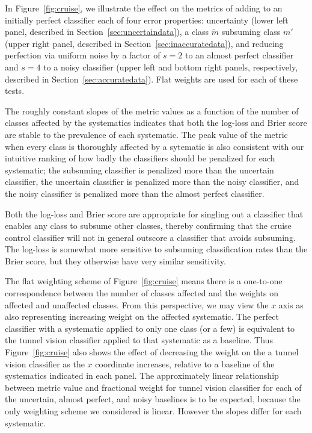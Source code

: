 In Figure~\ref{fig:cruise}, we illustrate the effect on the metrics of adding to an initially perfect classifier each of four error properties:
uncertainty (lower left panel, described in Section~\ref{sec:uncertaindata}),
a class $\tilde{m}$ subsuming class $m'$ (upper right panel, described in Section~\ref{sec:inaccuratedata}),
and reducing perfection via uniform noise by a factor of $s=2$ to an almost perfect classifier and $s=4$ to a noisy classifier (upper left and bottom right panels, respectively, described in Section~\ref{sec:accuratedata}).
Flat weights are used for each of these tests.

The roughly constant slopes of the metric values as a function of the number of classes affected by the systematics indicates that both the log-loss and Brier score are stable to the prevalence of each systematic.
The peak value of the metric when every class is thoroughly affected by a sytematic is also consistent with our intuitive ranking of how badly the classifiers should be penalized for each systematic; the subsuming classifier is penalized more than the uncertain classifier, the uncertain classifier is penalized more than the noisy classifier, and the noisy classifier is penalized more than the almost perfect classifier.

Both the log-loss and Brier score are appropriate for singling out a classifier that enables any class to subsume other classes, thereby confirming that the cruise control classifier will not in general outscore a classifier that avoids subsuming.
The log-loss is somewhat more sensitive to subsuming classification rates than the Brier score, but they otherwise have very similar sensitivity.

The flat weighting scheme of Figure~\ref{fig:cruise} means there is a one-to-one correspondence between the number of classes affected and the weights on affected and unaffected classes.
From this perspective, we may view the $x$ axis as also representing increasing weight on the affected systematic.
The perfect classifier with a systematic applied to only one class (or a few) is equivalent to the tunnel vision classifier applied to that systematic as a baseline.
Thus Figure~\ref{fig:cruise} also shows the effect of decreasing the weight on the a tunnel vision classifier as the $x$ coordinate increases, relative to a baseline of the systematics indicated in each panel.
The approximately linear relationship between metric value and fractional weight for tunnel vision classifier for each of the uncertain, almost perfect, and noisy baselines is to be expected, because the only weighting scheme we considered is linear.
However the slopes differ for each systematic.

